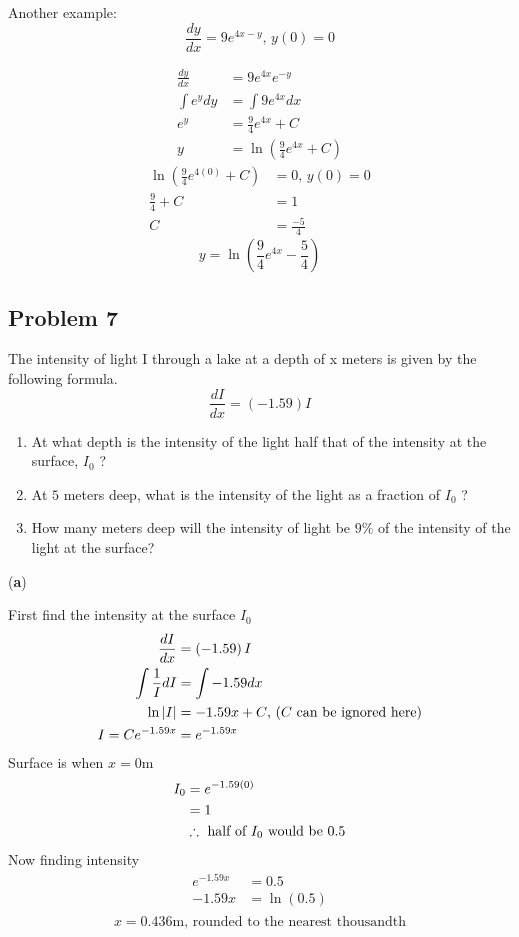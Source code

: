 \documentclass{article}
\begin{document}
Another example:
$$ \frac{dy}{dx} = 9e^{4x-y} \text{, } y(0) = 0 $$

\begin{align*}
    \frac{dy}{dx} & = 9e^{4x}e^{-y} \\
    \int e^ydy & = \int 9e^{4x} dx \\
    e^y & = \frac{9}{4}e^{4x} + C \\
    y & = \ln \left( \frac{9}{4}e^{4x} + C \right)
\end{align*}
\begin{align*}
    \ln \left(\frac{9}{4}e^{4(0)} + C \right) & = 0 \text{, } y(0) = 0 \\
    \frac{9}{4} + C & = 1 \\
    C & = \frac{-5}{4}
\end{align*}
\begin{equation*}
    \boxed{y = \ln \left( \frac{9}{4}e^{4x} - \frac{5}{4} \right)}
\end{equation*}

\subsection{Problem 7}

The intensity of light I through a lake at a depth of x meters is given by the following formula.
$$ \frac{dI}{dx} = \left( -1.59 \right) I $$
\begin{enumerate}[label=(\textbf{\alph*})]
    \item At what depth is the intensity of the light half that of the intensity at the surface, $ I_0 $ ?
    \item At $ 5 $ meters deep, what is the intensity of the light as a fraction of $ I_0 $ ?
    \item How many meters deep will the intensity of light be $ 9\% $ of the intensity of the light at the surface?
\end{enumerate}

(\textbf{a})

First find the intensity at the surface $ I_0 $
\begin{align*}
    \frac{dI}{dx} & = \left( -1.59 \right) I \\
    \int \frac{1}{I}dI & = \int -1.59dx \\
    \ln|I| & = -1.59x + C \text{, ($ C $ can be ignored here)} \\
    I = Ce^{-1.59x} & = e^{-1.59x}
\end{align*}
Surface is when $ x = 0 \text{m} $
\begin{align*}
    I_0 & = e^{-1.59(0)} \\
        & = 1 \\
        & \therefore \text{ half of $ I_0 $ would be $ 0.5 $}
\end{align*}
Now finding intensity
\begin{align*}
    e^{-1.59x} & = 0.5 \\
    -1.59x & = \ln(0.5) \\
\end{align*}
\begin{equation*}
    \boxed{x = 0.436 \text{m, rounded to the nearest thousandth}}
\end{equation*}
\end{document}
